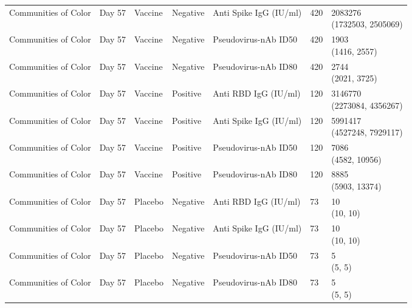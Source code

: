 \documentclass[]{book}
\theoremstyle{definition}
\theoremstyle{definition}
\theoremstyle{definition}
\newcommand{\1}{\mathbbm{1}}
\begin{document}
\begin{landscape}
\begin{ThreePartTable}
\begin{longtable}[t]{>{\raggedright\arraybackslash}p{7cm}llllll}
\hspace{1em}Communities of Color & Day 57 & Vaccine & Negative & Anti Spike IgG (IU/ml) & 420 & \makecell[l]{2083276\\(1732503, 2505069)}\\
\hspace{1em}Communities of Color & Day 57 & Vaccine & Negative & Pseudovirus-nAb ID50 & 420 & \makecell[l]{1903\\(1416, 2557)}\\
\hspace{1em}Communities of Color & Day 57 & Vaccine & Negative & Pseudovirus-nAb ID80 & 420 & \makecell[l]{2744\\(2021, 3725)}\\
\hspace{1em}Communities of Color & Day 57 & Vaccine & Positive & Anti RBD IgG (IU/ml) & 120 & \makecell[l]{3146770\\(2273084, 4356267)}\\
\hspace{1em}Communities of Color & Day 57 & Vaccine & Positive & Anti Spike IgG (IU/ml) & 120 & \makecell[l]{5991417\\(4527248, 7929117)}\\
\hspace{1em}Communities of Color & Day 57 & Vaccine & Positive & Pseudovirus-nAb ID50 & 120 & \makecell[l]{7086\\(4582, 10956)}\\
\hspace{1em}Communities of Color & Day 57 & Vaccine & Positive & Pseudovirus-nAb ID80 & 120 & \makecell[l]{8885\\(5903, 13374)}\\
\hspace{1em}Communities of Color & Day 57 & Placebo & Negative & Anti RBD IgG (IU/ml) & 73 & \makecell[l]{10\\(10, 10)}\\
\hspace{1em}Communities of Color & Day 57 & Placebo & Negative & Anti Spike IgG (IU/ml) & 73 & \makecell[l]{10\\(10, 10)}\\
\hspace{1em}Communities of Color & Day 57 & Placebo & Negative & Pseudovirus-nAb ID50 & 73 & \makecell[l]{5\\(5, 5)}\\
\hspace{1em}Communities of Color & Day 57 & Placebo & Negative & Pseudovirus-nAb ID80 & 73 & \makecell[l]{5\\(5, 5)}\\

\end{longtable}
\end{ThreePartTable}
\end{landscape}
\end{document}
